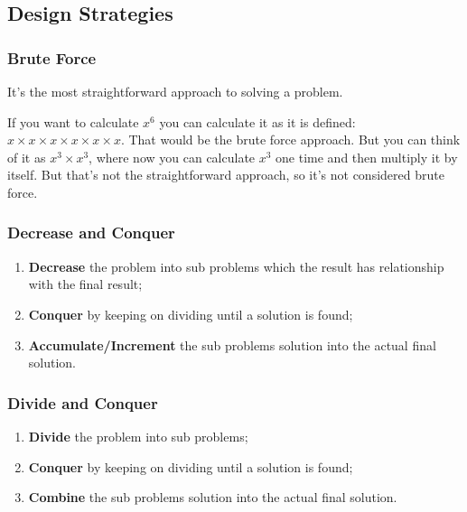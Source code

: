 \documentclass[a4paper,12pt]{article}
\theoremstyle{mytheoremstyle}
\theoremstyle{mytheoremstyle}
\theoremstyle{myproblemstyle}
\begin{document}
    \subsection{Design Strategies}

    \subsubsection{Brute Force}

    It's the most straightforward approach to solving a problem.

    If you want to calculate $ x^{6} $ you can calculate it as it is defined: $
    x \times x \times x \times x \times x \times x $. That would be the brute
    force approach. But you can think of it as $ x^{3} \times x^{3} $, where
    now you can calculate $ x^{3} $ one time and then multiply it by itself.
    But that's not the straightforward approach, so it's not considered brute
    force.

    \subsubsection{Decrease and Conquer}

    \begin{enumerate}
        \item \textbf{Decrease} the problem into sub problems which the result
            has relationship with the final result;

        \item \textbf{Conquer} by keeping on dividing until a solution is
            found;

        \item \textbf{Accumulate/Increment} the sub problems solution into the
            actual final solution.
    \end{enumerate}

    \subsubsection{Divide and Conquer}

    \begin{enumerate}
        \item \textbf{Divide} the problem into sub problems;

        \item \textbf{Conquer} by keeping on dividing until a solution is
            found;

        \item \textbf{Combine} the sub problems solution into the actual final
            solution.
    \end{enumerate}
\end{document}
